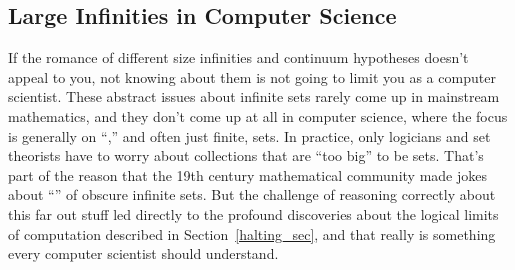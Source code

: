 \subsection{Large Infinities in Computer Science}

If the romance of different size infinities and continuum hypotheses
doesn't appeal to you, not knowing about them is not going to limit
you as a computer scientist.  These abstract issues about infinite
sets rarely come up in mainstream mathematics, and they don't come up
at all in computer science, where the focus is generally on
``,'' and often just finite, sets.  In practice, only
logicians and set theorists have to worry about collections that are
``too big'' to be sets.  That's part of the reason that the 19th
century mathematical community made jokes about ``'' of obscure infinite sets.  But the challenge of
reasoning correctly about this far out stuff led directly to the
profound discoveries about the logical limits of computation described
in Section~\ref{halting_sec}, and that really is something every
computer scientist should understand.

\endinput
